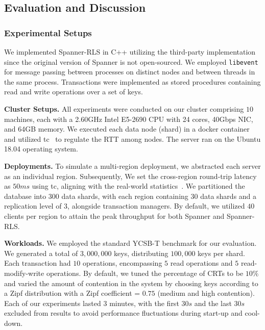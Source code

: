 \subsection{Evaluation and Discussion}\label{sec:spanner:eval}

\subsubsection{Experimental Setups} We implemented Spanner-RLS in C++ utilizing the third-party implementation~\cite{tapir:github} since the original version of Spanner is not open-sourced. We employed \texttt{libevent} for message passing between processes on distinct nodes and between threads in the same process. Transactions were implemented as stored procedures containing read and write operations over a set of keys.



\noindent\textbf{Cluster Setups.} All experiments were conducted on our cluster comprising $10$ machines, each with a 2.60GHz Intel E5-2690 CPU with 24 cores, 40Gbps NIC, and 64GB memory. We executed each data node (shard) in a docker container and utilized tc~\cite{linux:tc} to regulate the RTT among nodes. The server ran on the Ubuntu 18.04 operating system.


\noindent\textbf{Deployments.} To simulate a multi-region deployment, we abstracted each server as an individual region. Subsequently, We set the cross-region round-trip latency as $50ms$ using tc, aligning with the real-world statistics~\cite{azure:latency}. We partitioned the database into $300$ data shards, with each region containing $30$ data shards and a replication level of $3$, alongside transaction managers. By default, we utilized $40$ clients per region to attain the peak throughput for both Spanner and Spanner-RLS. 

\noindent\textbf{Workloads.} We employed the standard YCSB-T benchmark for our evaluation. We generated a total of $3,000,000$ keys, distributing $100,000$ keys per shard. Each transaction had $10$ operations, encompassing $5$ read operations and $5$ read-modify-write operations. By default, we tuned the percentage of CRTs to be $10\%$ and varied the amount of contention in the system by choosing keys according to a Zipf distribution with a Zipf coefficient = $0.75$ (medium and high contention). Each of our experiments lasted 3 minutes, with the first $30s$ and the last $30s$ excluded from results to avoid performance fluctuations during start-up and cool-down.

